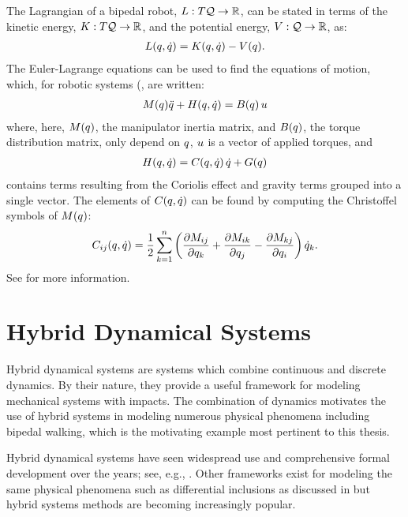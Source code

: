 The Lagrangian of a bipedal robot, $L : T\mathcal{Q} \to \mathbb{R}$, can be stated in terms of the kinetic energy, $K : T\mathcal{Q} \to \mathbb{R}$, and the potential energy, $V : \mathcal{Q} \to \mathbb{R}$, as:
%
\begin{align}
  L(q, \dot{q}) = K(q, \dot{q}) - V(q).
\end{align}
%
The Euler-Lagrange equations can be used to find the equations of motion, which, for robotic systems (\cite{Murray1994}, are written:
%
\begin{align}
  \label{eqn:eom}
  M(q)\ddot{q} + H(q, \dot{q}) = B(q) \, u
\end{align}
%
where, here, $M(q)$, the manipulator inertia matrix, and $B(q)$, the torque distribution matrix, only depend on $q$, $u$ is a vector of applied torques, and
\begin{align}
  H(q, \dot{q}) = C(q, \dot{q}) \, \dot{q} + G(q)
\end{align}
contains terms resulting from the Coriolis effect and gravity terms grouped into
a single vector.
%
The elements of $C(q, \dot{q})$ can be found by computing the Christoffel
symbols of $M(q)$:
\begin{align*}
  C_{ij}(q, \dot{q}) = \frac{1}{2} \sum_{k = 1}^{n} \left( \frac{\partial{M_{ij}}}{\partial{q_{k}}} +
    \frac{\partial{M_{ik}}}{\partial{q_{j}}} - \frac{\partial{M_{kj}}}{\partial{q_{i}}} \right) \dot{q}_{k}.
\end{align*}
See \cite[pp.~170]{Murray1994} for more information.

\section{Hybrid Dynamical Systems}

Hybrid dynamical systems are systems which combine continuous and discrete
dynamics.
%
By their nature, they provide a useful framework for modeling mechanical systems
with impacts.
%
The combination of dynamics motivates the use of hybrid systems in modeling
numerous physical phenomena including bipedal walking, which is the motivating
example most pertinent to this thesis.
%

Hybrid dynamical systems have seen widespread use and comprehensive formal
development over the years;
%
see, e.g.,
\cite{Branicky1998,Goebel2009,Grizzle2014,Schaft2000,Westervelt2007}.
%
Other frameworks exist for modeling the same physical phenomena such as
differential inclusions as discussed in \cite{Filippov1988} but hybrid systems
methods are becoming increasingly popular.

